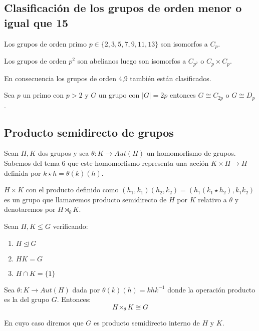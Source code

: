 \subsection{Clasificación de los grupos de orden menor o igual que 15}

Los grupos de orden primo $p \in \{2,3,5,7,9,11,13\}$ son isomorfos a $C_p$. 

Los grupos de orden $p^2$ son abelianos luego son isomorfos a $C_{p^2}$ o $C_p \times C_p$. 

En consecuencia los grupos de orden 4,9 también están clasificados. 

\begin{nprop}
Sea $p$ un primo con $p > 2$ y $G$ un grupo con $|G| = 2p$ entonces $G \cong C_{2p}$ o $G \cong D_p$. 
\end{nprop}

\subsection{Producto semidirecto de grupos}

\begin{nprop}
Sean $H,K$ dos grupos y sea $\theta:K \to Aut(H)$ un homomorfismo de grupos. Sabemos del tema 6 que este homomorfismo representa una acción $K \times H \to H$ definida por $k \star h = \theta(k)(h)$. 

$H \times K$ con el producto definido como $(h_1,k_1)(h_2,k_2) = (h_1(k_1 \star h_2),k_1k_2)$ es un grupo que llamaremos producto semidirecto de $H$ por $K$ relativo a $\theta$ y denotaremos por $H \rtimes_{\theta} K$. 
\end{nprop}

\begin{nth}
Sean $H,K \le G$ verificando:

\begin{enumerate}
\item $H \trianglelefteq G$
\item $HK = G$
\item $H \cap K = \{1\}$
\end{enumerate}

Sea $\theta:K \to Aut(H)$ dada por $\theta(k)(h) = khk^{-1}$ donde la operación producto es la del grupo $G$. Entonces: $$H\rtimes_{\theta}K \cong G$$

En cuyo caso diremos que $G$ es producto semidirecto interno de $H$ y $K$.
\end{nth}











